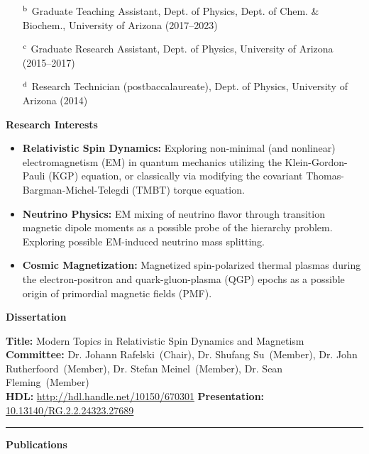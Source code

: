 \documentclass[11pt]{article}
\begin{document}
\begin{itemize}[leftmargin=*,nosep]
    \item[\(^{\rm b}\)] {\small Graduate Teaching Assistant, Dept. of Physics, Dept. of Chem. \& Biochem., University of Arizona (2017--2023)}
    \item[\(^{\rm c}\)] {\small Graduate Research Assistant, Dept. of Physics, University of Arizona (2015--2017)}
    \item[\(^{\rm d}\)] {\small Research Technician (postbaccalaureate), Dept. of Physics, University of Arizona (2014)}
\end{itemize}

\medskip

{\Large\textbf{Research Interests}}

\begin{itemize}[leftmargin=*,nosep]
    \item \textbf{Relativistic Spin Dynamics:} Exploring non-minimal (and nonlinear) electromagnetism (EM) in quantum mechanics utilizing the Klein-Gordon-Pauli (KGP) equation, or classically via modifying the covariant Thomas-Bargman-Michel-Telegdi (TMBT) torque equation.
    \item \textbf{Neutrino Physics:} EM mixing of neutrino flavor through transition magnetic dipole moments as a possible probe of the hierarchy problem. Exploring possible EM-induced neutrino mass splitting.
    \item \textbf{Cosmic Magnetization:} Magnetized spin-polarized thermal plasmas during the electron-positron and quark-gluon-plasma (QGP) epochs as a possible origin of primordial magnetic fields (PMF).
\end{itemize}

\medskip

{\Large\textbf{Dissertation}}

\textbf{Title:} Modern Topics in Relativistic Spin Dynamics and Magnetism\\[0.3em]
\textbf{Committee:} Dr. Johann Rafelski~(Chair), Dr. Shufang Su~(Member), Dr. John Rutherfoord~(Member), Dr. Stefan Meinel~(Member), Dr. Sean Fleming~(Member)\\[0.3em]
\textbf{HDL:} \href{http://hdl.handle.net/10150/670301}{http://hdl.handle.net/10150/670301} \textbf{Presentation:} \href{http://dx.doi.org/10.13140/RG.2.2.24323.27689}{10.13140/RG.2.2.24323.27689}

\noindent\rule{\linewidth}{1.0pt}

{\Large\textbf{Publications}}
\end{document}
